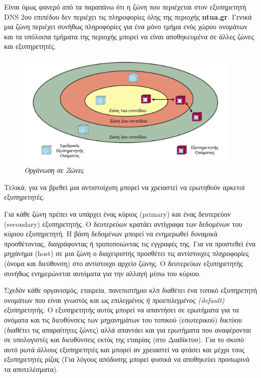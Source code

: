 Είναι όμως φανερό από τα παραπάνω ότι η ζώνη που περιέχεται στον εξυπηρετητή DNS 2ου επιπέδου δεν περιέχει τις πληροφορίες όλης της περιοχής \textbf{ntua.gr}. Γενικά μια ζώνη περιέχει συνήθως πληροφορίες για ένα μόνο τμήμα ενός χώρου ονομάτων και τα υπόλοιπα τμήματα της περιοχής μπορεί να είναι αποθηκευμένα σε άλλες ζώνες και εξυπηρετητές.\\
\boxline

\begin{figure}[!ht]
  \centering
  \includegraphics[width=0.95\textwidth]{images/chapter6/6-4}
  \caption {\textsl{Οργάνωση σε Ζώνες}}
  \label{6-4}
\end{figure}

Τελικά, για να βρεθεί μια αντιστοίχιση μπορεί να χρειαστεί να ερωτηθούν αρκετοί εξυπηρετητές.

Για κάθε ζώνη πρέπει να υπάρχει ένας κύριος (primary) και ένας δευτερεύον (sec\-ondary) εξυπηρετητής. O δευτερεύων κρατάει αντίγραφα των δεδομένων του κύριου εξυπηρετητή. Η βάση δεδομένων μπορεί να ενημερωθεί δυναμικά προσθέτοντας, διαγράφοντας ή τροποποιώντας τις εγγραφές της. Για να προστεθεί ένα μηχάνημα (host) σε μια ζώνη ο διαχειριστής προσθέτει τις αντίστοιχες πληροφορίες (όνομα και διεύθυνση) στο αντίστοιχο αρχείο ζώνης. Ο δευτερεύων εξυπηρετητής συνήθως ενημερώνεται αυτόματα για την αλλαγή μέσω του κύριου.

Σχεδόν κάθε οργανισμός, εταιρεία, πανεπιστήμιο κλπ διαθέτει ένα τοπικό εξυπηρετητή ονομάτων που είναι γνωστός και ως \emph{επιλεγμένος ή προεπιλεγμένος (default)} εξυπηρετητής. Ο εξυπηρετητής αυτός μπορεί να απαντήσει σε ερωτήματα για τα ονόματα και τις διευθύνσεις των μηχανημάτων του τοπικού (εσωτερικού) δικτύου (διαθέτει τις απαραίτητες ζώνες) αλλά απαντάει και για ερωτήματα που αναφέρονται σε υπολογιστές και διευθύνσεις εκτός της εταιρίας (στο Διαδίκτυο). Για το σκοπό αυτό ρωτά άλλους εξυπηρετητές και μπορεί αν χρειαστεί να φτάσει και μέχρι τους εξυπηρετητές ρίζας (Για λόγους απόδοσης μπορεί φυσικά να αποθηκεύει προσωρινά τα αποτελέσματα).


